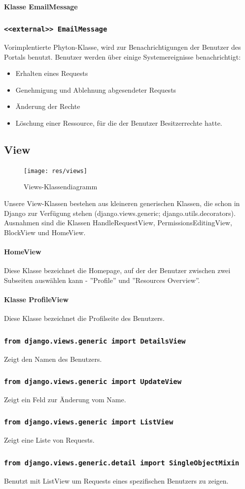 \documentclass[parskip=full,11pt]{scrartcl}
\newcommand{\class}[1]{\subsubsection*{\lstinline[basicstyle=\ttfamily\large]{#1}}}
\begin{document}
 
 
  \paragraph*{Klasse EmailMessage}
 \class{<<external>> EmailMessage}
Vorimplentierte Phyton-Klasse, wird zur Benachrichtigungen der Benutzer des Portals benutzt. Benutzer werden über einige Systemereignisse benachrichtigt:
 \begin{itemize}
	\item Erhalten eines Requests
	\item Genehmigung und Ablehnung abgesendeter Requests
	\item Änderung der Rechte
	\item Löschung einer Ressource, für die der Benutzer Besitzerrechte hatte.
\end{itemize}
\newpage 
\subsection{View}
\begin{figure}[ht!]
	\centering
	\texttt{[image: res/views]}
	\caption{Views-Klassendiagramm}
\end{figure}

Unsere View-Klassen bestehen aus kleineren generischen Klassen, die schon in Django zur Verfügung stehen (django.views.generic; django.utils.decorators). Ausnahmen sind die Klassen HandleRequestView, PermissionsEditingView, BlockView und HomeView.

\paragraph*{HomeView}
Diese Klasse bezeichnet die Homepage, auf der der Benutzer zwischen zwei Subseiten auswählen kann - ''Profile'' und ''Resources Overview''.

\paragraph*{Klasse ProfileView}
 Diese Klasse bezeichnet die Profilseite des Benutzers.
\class{from django.views.generic import DetailsView} 
 Zeigt den Namen des Benutzers.
\class{from django.views.generic import UpdateView}
 Zeigt ein Feld zur Änderung vom Name.
\class{from django.views.generic import ListView}
 Zeigt eine Liste von Requests.
\class{from django.views.generic.detail import SingleObjectMixin}
 Benutzt mit ListView um Requests eines spezifischen Benutzers zu zeigen.
 
\end{document}
